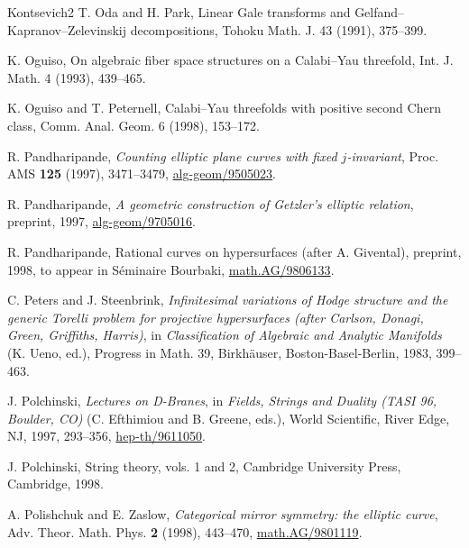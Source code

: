 \begin{thebibliography}{Kontsevich2}
\hypertarget{bib:OdP}{}
T. Oda and H. Park,
Linear Gale transforms and Gelfand--Kapranov--Zelevinskij decompositions,
Tohoku Math. J. 43 (1991), 375--399.

\hypertarget{bib:Oguiso}{}
K. Oguiso, On algebraic fiber space structures on a Calabi--Yau threefold, Int. J. Math. 4 (1993), 439--465.

\hypertarget{bib:OgP}{}
K. Oguiso and T. Peternell, Calabi--Yau threefolds with positive second Chern class, Comm. Anal. Geom. 6 (1998), 153--172.

\hypertarget{bib:Pandharipande1}{} R. Pandharipande, \emph{Counting elliptic plane curves with fixed $j$-invariant}, Proc. AMS \textbf{125} (1997), 3471--3479, \href{https://arxiv.org/abs/alg-geom/9505023}{alg-geom/9505023}.

\hypertarget{bib:Pandharipande2}{} R. Pandharipande, \emph{A geometric construction of Getzler's elliptic relation}, preprint, 1997, \href{https://arxiv.org/abs/alg-geom/9705016}{alg-geom/9705016}.

\hypertarget{bib:Pandharipande3}{}
R. Pandharipande, Rational curves on hypersurfaces (after A. Givental), preprint, 1998, to appear in Séminaire Bourbaki, \href{https://arxiv.org/abs/math/9806133}{math.AG/9806133}.

\hypertarget{bib:PS}{} C. Peters and J. Steenbrink, \emph{Infinitesimal variations of Hodge structure and the generic Torelli problem for projective hypersurfaces (after Carlson, Donagi, Green, Griffiths, Harris)}, in \emph{Classification of Algebraic and Analytic Manifolds} (K. Ueno, ed.), Progress in Math. 39, Birkhäuser, Boston-Basel-Berlin, 1983, 399--463.

\hypertarget{bib:Polchinski1}{} J. Polchinski, \emph{Lectures on D-Branes}, in \emph{Fields, Strings and Duality (TASI 96, Boulder, CO)} (C. Efthimiou and B. Greene, eds.), World Scientific, River Edge, NJ, 1997, 293--356, \href{https://arxiv.org/abs/hep-th/9611050}{hep-th/9611050}.

\hypertarget{bib:Polchinski2}{}
J. Polchinski, String theory, vols. 1 and 2,
Cambridge University Press, Cambridge, 1998.

\hypertarget{bib:PZ}{} A. Polishchuk and E. Zaslow, \emph{Categorical mirror symmetry: the elliptic curve}, Adv. Theor. Math. Phys. \textbf{2} (1998), 443--470, \href{https://arxiv.org/abs/math.AG/9801119}{math.AG/9801119}.


\end{thebibliography}
